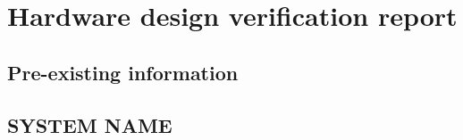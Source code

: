 \section{Hardware design verification report}
%
%

\subsection{Pre-existing information}
%

\subsection{SYSTEM NAME}
%
%
%
